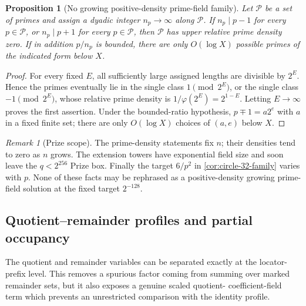 \documentclass[11pt,a4paper]{amsart}
\numberwithin{equation}{section}
\newtheorem{proposition}[proposition]{Proposition}
\theoremstyle{remark}
\newtheorem{remark}[remark]{Remark}
\newcommand{\Pcal}{\mathcal P}
\begin{document}
\begin{proposition}[No growing positive-density prime-field family]
\label{prop:no-growing-prime-density}
Let \(\Pcal\) be a set of primes and assign a dyadic integer
\(n_p\to\infty\) along \(\Pcal\).  If \(n_p\mid p-1\) for every
\(p\in\Pcal\), or \(n_p\mid p+1\) for every \(p\in\Pcal\), then
\(\Pcal\) has upper relative prime density zero.  If in addition
\(p/n_p\) is bounded, there are only \(O(\log X)\) possible primes of
the indicated form below \(X\).
\end{proposition}

\begin{proof}
For every fixed \(E\), all sufficiently large assigned lengths are
divisible by \(2^E\).  Hence the primes eventually lie in the single
class \(1\pmod {2^E}\), or the single class \(-1\pmod {2^E}\), whose
relative prime density is \(1/\varphi(2^E)=2^{1-E}\).  Letting
\(E\to\infty\) proves the first assertion.  Under the bounded-ratio
hypothesis, \(p\mp1=a2^e\) with \(a\) in a fixed finite set; there are
only \(O(\log X)\) choices of \((a,e)\) below \(X\).
\end{proof}

\begin{remark}[Prize scope]
The prime-density statements fix \(n\); their densities tend to zero as
\(n\) grows.  The extension towers have exponential field size and soon
leave the \(q<2^{256}\) Prize box.  Finally the target \(6/p^2\) in
\cref{cor:circle-32-family} varies with \(p\).  None of these facts may be
rephrased as a positive-density growing prime-field solution at the fixed
target \(2^{-128}\).
\end{remark}

\subsection{Quotient--remainder profiles and partial occupancy}
\label{sec:quotient-obstruction}

The quotient and remainder variables can be separated exactly at the
locator-prefix level.  This removes a spurious factor coming from summing
over marked remainder sets, but it also exposes a genuine scaled quotient-
coefficient-field term which prevents an unrestricted comparison with the
identity profile.
\end{document}
